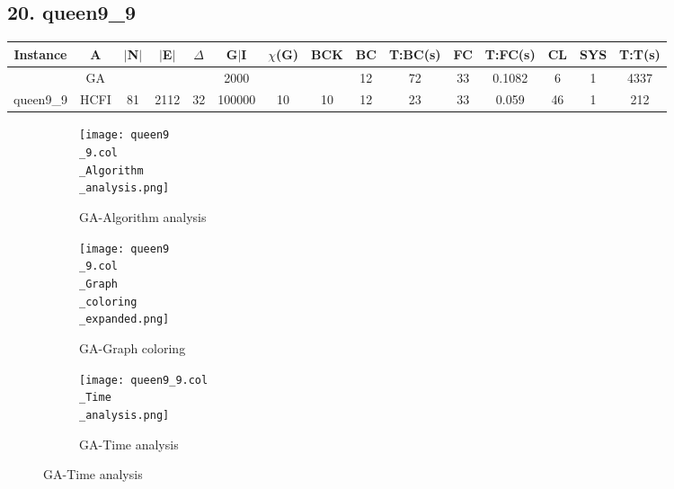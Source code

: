\documentclass[10pt]{article}
\begin{document}
\subsection*{\hspace{0,9073976cm} 20. queen9\_9}
\begin{table}[H]
\centering
\begin{tabular}{|c|c|c|c|c|c|c|c|c|c|c|c|c|c|c|}
\hline
Instance& A &$|$N$|$ & $|$E$|$ & $\Delta$ & G$|$I & $\chi$(G) &BCK&BC & T:BC(s) & FC & T:FC(s) & CL & SYS & T:T(s) \\ \hline \hline
&GA&       &                   &                     &2000         &     \cellcolor{yellow} & {\cellcolor{yellow}}& {{\cellcolor{green}12}}
&72   &33        &0.1082                   &  6                   &1          &4337         \\ \cline{2-2} \cline{6-6} \cline{9-15}
 \multirow{-2}{*}{queen9\_9} &HCFI   &\multirow{-2}{*}{81}   &\multirow{-2}{*}{2112}     &\multirow{-2}{*}{32}     &100000     &\multirow{-2}{*}{\cellcolor{yellow}10}      & \multirow{-2}{*}{\cellcolor{yellow}10}    &{\cellcolor{green}12}     &23        &33     &0.059         &46    & 1    & 212      \\ \hline  
\end{tabular}
\end{table}
\graphicspath{{./Core1/Solutions/GA/queen9\_9.col}}
\begin{figure}[H]
\begin{subfigure}{.33\textwidth}
  \centering
  \texttt{[image: queen9\\\_9.col\\\_Algorithm\\\_analysis.png]}
  \caption{GA-Algorithm analysis}
   \label{fig:subfig1}
\end{subfigure}%
\begin{subfigure}{.33\textwidth}
  \centering
  \texttt{[image: queen9\\\_9.col\\\_Graph\\\_coloring\\\_expanded.png]}
  \caption{GA-Graph coloring}
  \label{fig:subfig2}
\end{subfigure}
\begin{subfigure}{.33\textwidth}
  \centering
  \texttt{[image: queen9\_9.col\\\_Time\\\_analysis.png]}
  \caption{GA-Time analysis}
  \end{subfigure}
\end{figure}
\end{document}
